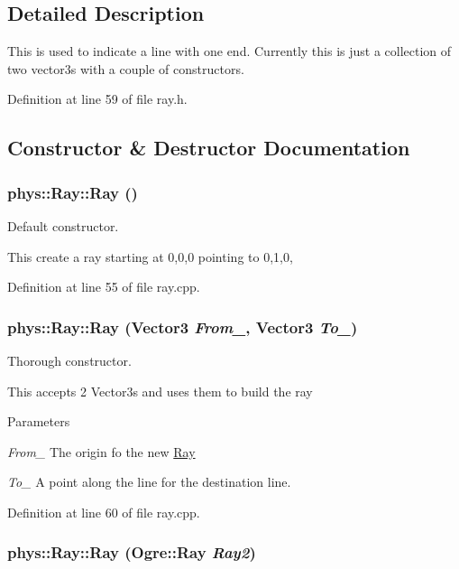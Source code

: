\subsection{Detailed Description}
This is used to indicate a line with one end. Currently this is just a collection of two vector3s with a couple of constructors. 

Definition at line 59 of file ray.h.



\subsection{Constructor \& Destructor Documentation}
\hypertarget{classphys_1_1Ray_a35f4f5eec653ea561353163eaad672d3}{
\subsubsection[{Ray}]{\setlength{\rightskip}{0pt plus 5cm}phys::Ray::Ray ()}}
\label{df/d57/classphys_1_1Ray_a35f4f5eec653ea561353163eaad672d3}


Default constructor. 

This create a ray starting at 0,0,0 pointing to 0,1,0, 

Definition at line 55 of file ray.cpp.

\hypertarget{classphys_1_1Ray_aa6123ef37a2351e6cca3954c23212379}{
\subsubsection[{Ray}]{\setlength{\rightskip}{0pt plus 5cm}phys::Ray::Ray ({\bf Vector3} {\em From\_\-}, \/  {\bf Vector3} {\em To\_\-})}}
\label{df/d57/classphys_1_1Ray_aa6123ef37a2351e6cca3954c23212379}


Thorough constructor. 

This accepts 2 Vector3s and uses them to build the ray 
\begin{DoxyParams}{Parameters}
\item[{\em From\_\-}]The origin fo the new \hyperlink{classphys_1_1Ray}{Ray} \item[{\em To\_\-}]A point along the line for the destination line. \end{DoxyParams}


Definition at line 60 of file ray.cpp.

\hypertarget{classphys_1_1Ray_a395485ffe19e6a53966730c01a2781c1}{
\subsubsection[{Ray}]{\setlength{\rightskip}{0pt plus 5cm}phys::Ray::Ray (Ogre::Ray {\em Ray2})}}
\label{df/d57/classphys_1_1Ray_a395485ffe19e6a53966730c01a2781c1}


